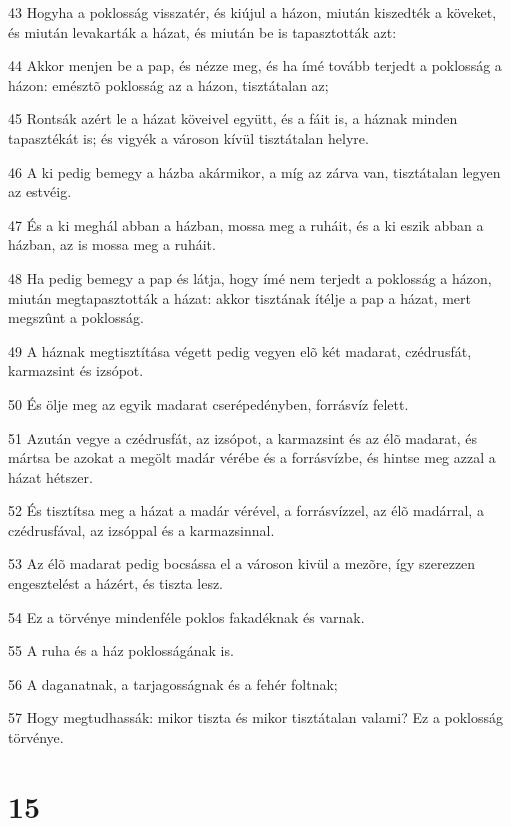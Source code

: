 \par 43 Hogyha a poklosság visszatér, és kiújul a házon, miután kiszedték a köveket, és miután levakarták a házat, és miután be is tapasztották azt:
\par 44 Akkor menjen be a pap, és nézze meg, és ha ímé tovább terjedt a poklosság a házon: emésztõ poklosság az a házon, tisztátalan az;
\par 45 Rontsák azért le a házat köveivel együtt, és a fáit is, a háznak minden tapasztékát is; és vigyék a városon kívül tisztátalan helyre.
\par 46 A ki pedig bemegy a házba akármikor, a míg az zárva van, tisztátalan legyen az estvéig.
\par 47 És a ki meghál abban a házban, mossa meg a ruháit, és a ki eszik abban a házban, az is mossa meg a ruháit.
\par 48 Ha pedig bemegy a pap és látja, hogy ímé nem terjedt a poklosság a házon, miután megtapasztották a házat: akkor tisztának ítélje a pap a házat, mert megszûnt a poklosság.
\par 49 A háznak megtisztítása végett pedig vegyen elõ két madarat, czédrusfát, karmazsint és izsópot.
\par 50 És ölje meg az egyik madarat cserépedényben, forrásvíz felett.
\par 51 Azután vegye a czédrusfát, az izsópot, a karmazsint és az élõ madarat, és mártsa be azokat a megölt madár vérébe és a forrásvízbe, és hintse meg azzal a házat hétszer.
\par 52 És tisztítsa meg a házat a madár vérével, a forrásvízzel, az élõ madárral, a czédrusfával, az izsóppal és a karmazsinnal.
\par 53 Az élõ madarat pedig bocsássa el a városon kivül a mezõre, így szerezzen engesztelést a házért, és tiszta lesz.
\par 54 Ez a törvénye mindenféle poklos fakadéknak és varnak.
\par 55 A ruha és a ház poklosságának is.
\par 56 A daganatnak, a tarjagosságnak és a fehér foltnak;
\par 57 Hogy megtudhassák: mikor tiszta és mikor tisztátalan valami? Ez a poklosság törvénye.

\chapter{15}

